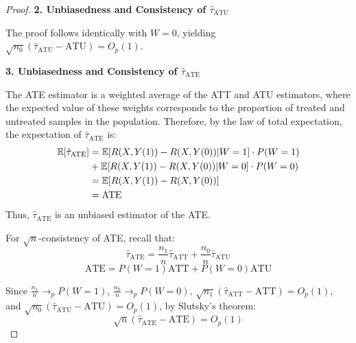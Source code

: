 \documentclass{article}
\begin{document}
\begin{proof}
  \textbf{2. Unbiasedness and Consistency of $\hat{\tau}_{\text{ATU}}$}
  
  The proof follows identically with $W = 0$, yielding $\sqrt{n_0}(\hat{\tau}_{\text{ATU}} - \text{ATU}) = O_p(1)$.
  
  \textbf{3. Unbiasedness and Consistency of $\hat{\tau}_{\text{ATE}}$}
  
  The ATE estimator is a weighted average of the ATT and ATU estimators, where the expected value of these weights corresponds to the proportion of treated and untreated samples in the population. Therefore, by the law of total expectation, the expectation of $\hat{\tau}_{\text{ATE}}$ is:
  \begin{align*}
  \mathbb{E}[\hat{\tau}_{\text{ATE}}] &= \mathbb{E}[R(X, Y(1)) - R(X, Y(0)) | W = 1] \cdot P(W = 1) \\
  &+ \mathbb{E}[R(X, Y(1)) - R(X, Y(0)) | W = 0] \cdot P(W = 0) \\
  &= \mathbb{E}[R(X, Y(1)) - R(X, Y(0))] \\
  &= \text{ATE}
  \end{align*}
  Thus, $\hat{\tau}_{\text{ATE}}$ is an unbiased estimator of the ATE.

  For $\sqrt{n}$-consistency of ATE, recall that:
\[\hat{\tau}_{\text{ATE}} = \frac{n_1}{n}\hat{\tau}_{\text{ATT}} + \frac{n_0}{n}\hat{\tau}_{\text{ATU}}\]
\[\text{ATE} = P(W=1)\text{ATT} + P(W=0)\text{ATU}\]

  Since $\frac{n_1}{n} \to_p P(W=1)$, $\frac{n_0}{n} \to_p P(W=0)$, $\sqrt{n_1}(\hat{\tau}_{\text{ATT}} - \text{ATT}) = O_p(1)$, and $\sqrt{n_0}(\hat{\tau}_{\text{ATU}} - \text{ATU}) = O_p(1)$, by Slutsky's theorem:
  \[\sqrt{n}(\hat{\tau}_{\text{ATE}} - \text{ATE}) = O_p(1)\]
\end{proof}
\end{document}
